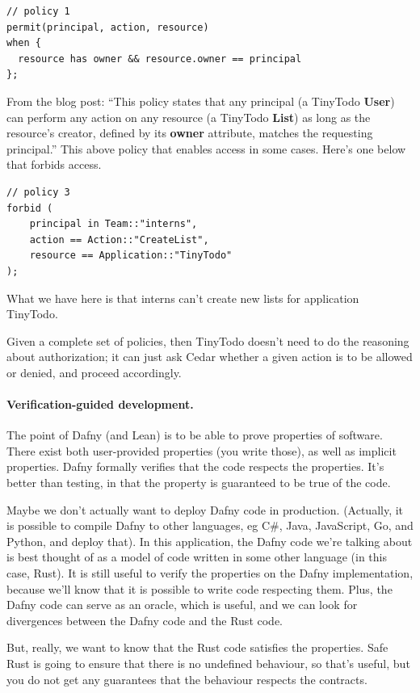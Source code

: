 \documentclass[11pt]{article}
\begin{document}
\begin{verbatim}
// policy 1
permit(principal, action, resource)
when {
  resource has owner && resource.owner == principal
};
\end{verbatim}
From the blog post: ``This policy states that any principal (a TinyTodo \textbf{User}) can perform any action on any resource (a TinyTodo \textbf{List}) as long as the resource’s creator, defined by its \textbf{owner} attribute, matches the requesting principal.'' This above policy that enables access in some cases. Here's one below that forbids access.
\begin{verbatim}
// policy 3
forbid (
	principal in Team::"interns",
	action == Action::"CreateList",
	resource == Application::"TinyTodo"
);
\end{verbatim}
What we have here is that interns can't create new lists for application TinyTodo.

Given a complete set of policies, then TinyTodo doesn't need to do the reasoning about authorization; it can just
ask Cedar whether a given action is to be allowed or denied, and proceed accordingly.

\paragraph{Verification-guided development.} The point of Dafny (and Lean) is to be able to prove
properties of software.
There exist both user-provided properties (you write those), as well as implicit properties.
Dafny
formally verifies that the code respects the properties.  It's better
than testing, in that the property is guaranteed to be true of the
code.

Maybe we don't actually want to deploy Dafny code in
production. (Actually, it is possible to compile Dafny to
other languages, eg C\#, Java, JavaScript, Go, and Python, and deploy that). In this application, the Dafny code we're talking about is best thought of as a
model of code written in some other language (in this case, Rust). It
is still useful to verify the properties on the Dafny implementation,
because we'll know that it is possible to write code respecting
them. Plus, the Dafny code can serve as an oracle, which is useful,
and we can look for divergences between the Dafny code and the Rust
code.

But, really, we want to know that the Rust code satisfies the properties.
Safe Rust is going to ensure that there is no undefined behaviour, so that's
useful, but you do not get any guarantees that the behaviour respects the contracts.
\end{document}
